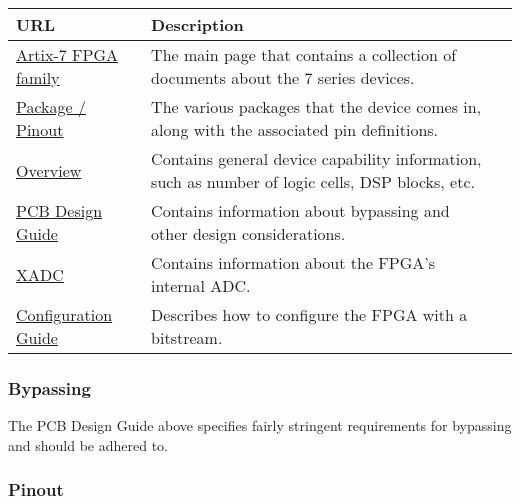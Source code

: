 \label{tab:xc7a15t-ftg256-documents}
\begin{tabularx}{\textwidth}{l X>{\raggedright\arraybackslash}X}
        \caption{Important documents.} \\
        \toprule
        \textbf{URL} & \textbf{Description} \\
        \midrule
        \endhead

        \href{https://www.xilinx.com/products/silicon-devices/fpga/artix-7.html?resultsTablePreSelect=documenttype:Data\%20Sheets#documentation}{Artix-7
          FPGA family} & The main page that contains a collection of documents about the 7 series
        devices. \\
        \href{https://www.xilinx.com/support/documentation/user_guides/ug475_7Series_Pkg_Pinout.pdf}{Package
          / Pinout} & The various packages that the device comes in, along with the associated pin
        definitions. \\
        \href{https://www.xilinx.com/support/documentation/data_sheets/ds180_7Series_Overview.pdf}{Overview}
        & Contains
        general device capability information, such as number of logic cells, DSP blocks, etc. \\
        \href{https://www.xilinx.com/support/documentation/user_guides/ug483_7Series_PCB.pdf}{PCB
          Design Guide} &
        Contains information about bypassing and other design considerations. \\
        \href{https://www.xilinx.com/support/documentation/user_guides/ug480_7Series_XADC.pdf}{XADC}
        & Contains
        information about the FPGA's internal ADC. \\
        \href{https://www.xilinx.com/support/documentation/user_guides/ug470_7Series_Config.pdf}{Configuration
          Guide} &
        Describes how to configure the FPGA with a bitstream. \\

        \bottomrule
\end{tabularx}

\subsubsection{Bypassing}
\label{sec:xc7a15t-ftg256-bypassing}

The PCB Design Guide above specifies fairly stringent requirements for bypassing and should be adhered to.

\subsubsection{Pinout}
\label{sec:xc7a15t-ftg256-pinout}


